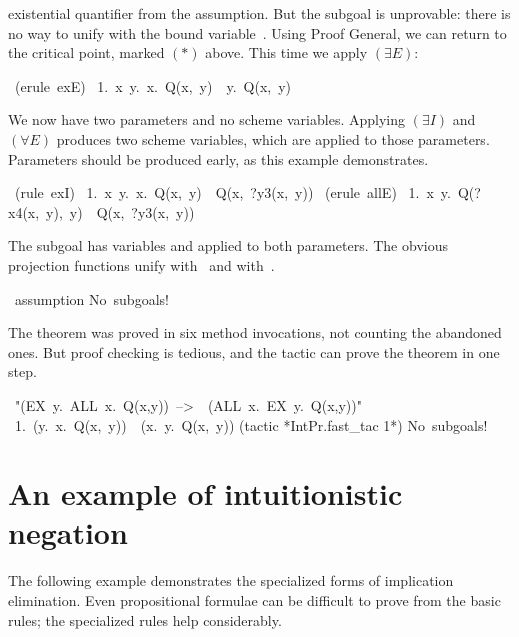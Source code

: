 existential quantifier from the assumption.  But the subgoal is unprovable:
there is no way to unify  with the bound variable~.
Using Proof General, we can return to the critical point, marked
$(*)$ above.  This time we apply $({\exists}E)$:
\begin{isabelle}
\ (erule\ exE)\isanewline
\ 1.\ \isasymAnd x\ y.\ \isasymforall x.\ Q(x,\ y)\
\isasymLongrightarrow \ \isasymexists y.\ Q(x,\ y)
\end{isabelle}
We now have two parameters and no scheme variables.  Applying
$({\exists}I)$ and $({\forall}E)$ produces two scheme variables, which are
applied to those parameters.  Parameters should be produced early, as this
example demonstrates.
\begin{isabelle}
\ (rule\ exI)\isanewline
\ 1.\ \isasymAnd x\ y.\ \isasymforall x.\ Q(x,\ y)\
\isasymLongrightarrow \ Q(x,\ ?y3(x,\ y))
\isanewline
{}\ (erule\ allE)\isanewline
\ 1.\ \isasymAnd x\ y.\ Q(?x4(x,\ y),\ y)\ \isasymLongrightarrow \
Q(x,\ ?y3(x,\ y))
\end{isabelle}
The subgoal has variables \isa{?y3} and \isa{?x4} applied to both
parameters.  The obvious projection functions unify  with~\isa{
x} and  with~.
\begin{isabelle}
\isacommand{apply}\ assumption\isanewline
No\ subgoals!\isanewline
\isacommand{done}
\end{isabelle}
The theorem was proved in six method invocations, not counting the
abandoned ones.  But proof checking is tedious, and the \ML{} tactic
 can prove the theorem in one step.
\begin{isabelle}
\isacommand{lemma}\ "(EX\ y.\ ALL\ x.\ Q(x,y))\ -->\ \ (ALL\ x.\ EX\ y.\ Q(x,y))"\isanewline
\ 1.\ (\isasymexists y.\ \isasymforall x.\ Q(x,\ y))\
\isasymlongrightarrow \ (\isasymforall x.\ \isasymexists y.\ Q(x,\ y))
\isanewline
\isacommand{by} (tactic {*IntPr.fast_tac 1*})\isanewline
No\ subgoals!
\end{isabelle}


\section{An example of intuitionistic negation}
The following example demonstrates the specialized forms of implication
elimination.  Even propositional formulae can be difficult to prove from
the basic rules; the specialized rules help considerably.  

